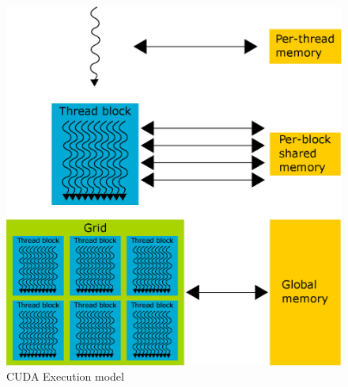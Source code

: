 \begin{figure}[h]
  \centering
  \includegraphics[width=0.8\linewidth]{img/CUDAmemoryHierarchy.eps}
  \caption{CUDA Execution model}
  \label{fig:cudamemhierarchy}
\end{figure}

